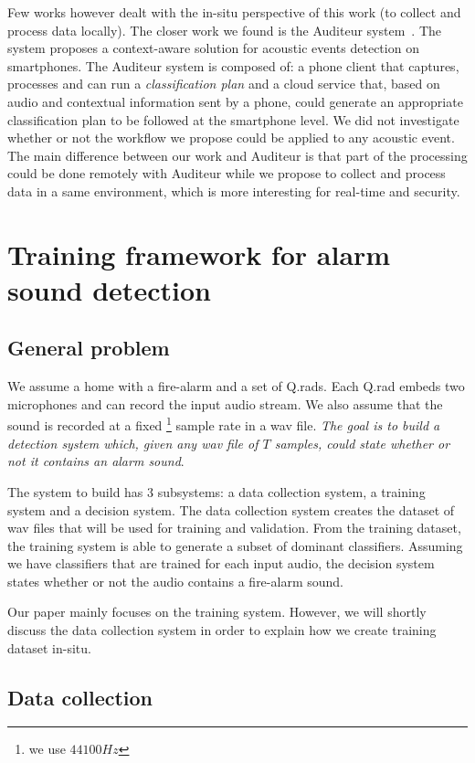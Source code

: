\documentclass[10pt, conference, compsocconf]{IEEEtran}
\begin{document}
Few works however dealt with the in-situ perspective of this work (to collect and process data locally). The closer work we found is the 
Auditeur system~\cite{Nirjon:2013:AMS:2462456.2464446}. The system proposes a context-aware solution for acoustic events detection on smartphones. 
The Auditeur system is composed of: a phone client that captures, processes and can run a {\it classification plan} and a cloud 
service that, based on audio and contextual information sent by a phone, could generate an appropriate classification plan to be 
followed at the smartphone level. We did not investigate whether or not the workflow we propose could be applied 
to any acoustic event. The main difference between our work and Auditeur is that part of the processing could be done 
remotely with Auditeur while we propose to collect and process 
data in a same environment, which is more interesting for real-time and security.

\section{Training framework for alarm sound detection } \label{Framework}
\subsection{General problem}

We assume a home with a fire-alarm and a set of Q.rads. Each Q.rad embeds two microphones and can record the input audio 
stream. We also assume that the sound is recorded at a fixed \footnote{we use $44100Hz$} sample rate in a wav file. {\it The goal is to build  a detection system which, given any wav file of $T$ samples, could state whether or not it contains an alarm sound}.

The system to build has $3$ subsystems: a data collection system, a training system and a decision system. 
The data collection system creates the dataset of wav files that will be used for training and validation. 
From the training dataset, the training system is able to generate a subset of dominant classifiers. Assuming we have classifiers that are trained for each input audio, the decision system states whether or not the audio contains a fire-alarm sound.

Our paper mainly focuses on the training system. However, we will shortly discuss the data collection system in order 
to explain how we create training dataset in-situ.

\subsection{Data collection}
\end{document}
